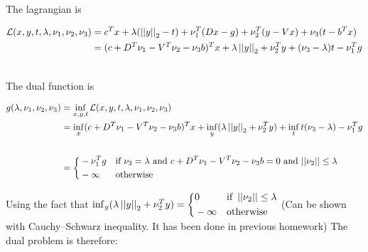 \documentclass{article}
\begin{document}
The lagrangian is

\begin{equation*}
    \begin{aligned}
        \mathcal{L}(x, y, t, \lambda, \nu_1, \nu_2, \nu_3) & = c^Tx + \lambda(\left|\left| y \right|\right|_2 - t) + \nu_1^T(Dx - g) + \nu_2^T(y - Vx) + \nu_3(t - b^Tx)                 \\
                                                           & = (c + D^T\nu_1 - V^T\nu_2 - \nu_3b)^Tx + \lambda\left|\left| y \right|\right|_2 + \nu_2^Ty + (\nu_3 - \lambda)t - \nu_1^Tg \\                  \\
    \end{aligned}
\end{equation*}

The dual function is

\begin{equation*}
    \begin{aligned}
        g(\lambda, \nu_1, \nu_2, \nu_3) & = \inf_{x, y, t} \mathcal{L}(x, y, t, \lambda, \nu_1, \nu_2, \nu_3)                                                          \\
                                        & = \inf_x (c + D^T\nu_1 - V^T\nu_2 - \nu_3b)^Tx + \inf_y(\lambda\left|\left| y \right|\right|_2 + \nu_2^Ty) + \inf_t t(\nu_3 - \lambda) - \nu_1^Tg \\                  \\
                                        & = \bigg\{\begin{aligned}
             & - \nu_1^Tg &  & \text{if $\nu_3 = \lambda$ and $c + D^T\nu_1 - V^T\nu_2 - \nu_3b=0$ and $\left|\left| \nu_2 \right|\right| \le \lambda$} \\
             & - \infty   &  & \text{otherwise}
        \end{aligned}
    \end{aligned}
\end{equation*}

Using the fact that $\inf_y(\lambda\left|\left| y \right|\right|_2 + \nu_2^Ty) = \bigg\{
    \begin{aligned}
         & 0        &  & \text{if } \left|\left| \nu_2 \right|\right| \le \lambda \\
         & - \infty &  & \text{otherwise}
    \end{aligned}$ (Can be shown with Cauchy–Schwarz inequality. It has been done in previous homework)
The dual problem is therefore:
\end{document}
